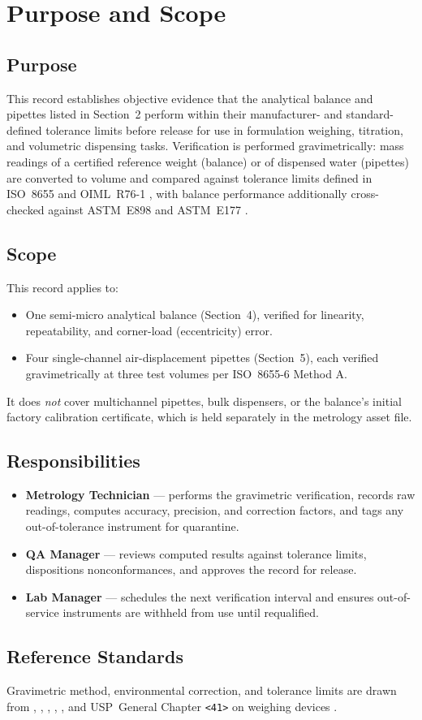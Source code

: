 \section{Purpose and Scope}

\subsection{Purpose}
This record establishes objective evidence that the analytical balance and pipettes listed in
Section~2 perform within their manufacturer- and standard-defined tolerance limits before
release for use in formulation weighing, titration, and volumetric dispensing tasks. Verification
is performed gravimetrically: mass readings of a certified reference weight (balance) or of
dispensed water (pipettes) are converted to volume and compared against tolerance limits defined
in ISO~8655 \cite{iso8655-1,iso8655-6} and OIML~R76-1 \cite{oiml-r76}, with balance performance
additionally cross-checked against ASTM~E898 \cite{astm-e898} and ASTM~E177 \cite{astm-e177}.

\subsection{Scope}
This record applies to:
\begin{itemize}[leftmargin=1.4em]
  \item One semi-micro analytical balance (Section~4), verified for linearity, repeatability,
        and corner-load (eccentricity) error.
  \item Four single-channel air-displacement pipettes (Section~5), each verified gravimetrically
        at three test volumes per ISO~8655-6 Method A.
\end{itemize}
It does \emph{not} cover multichannel pipettes, bulk dispensers, or the balance's initial
factory calibration certificate, which is held separately in the metrology asset file.

\subsection{Responsibilities}
\begin{itemize}[leftmargin=1.4em]
  \item \textbf{Metrology Technician} --- performs the gravimetric verification, records raw
        readings, computes accuracy, precision, and correction factors, and tags any
        out-of-tolerance instrument for quarantine.
  \item \textbf{QA Manager} --- reviews computed results against tolerance limits, dispositions
        nonconformances, and approves the record for release.
  \item \textbf{Lab Manager} --- schedules the next verification interval and ensures
        out-of-service instruments are withheld from use until requalified.
\end{itemize}

\subsection{Reference Standards}
Gravimetric method, environmental correction, and tolerance limits are drawn from
\cite{iso8655-1}, \cite{iso8655-6}, \cite{oiml-r76}, \cite{astm-e898}, \cite{astm-e177}, and
USP~General Chapter \texttt{<41>} on weighing devices \cite{usp41}.

